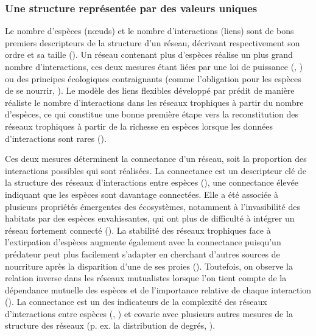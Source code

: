 \subsubsection{Une structure représentée par des valeurs uniques} 

Le nombre d'espèces (nœuds) et le nombre d'interactions (liens) sont de bons
premiers descripteurs de la structure d'un réseau, décrivant respectivement son
ordre et sa taille (\cite{Delmas2019Analysing}). Un réseau contenant plus
d'espèces réalise un plus grand nombre d'interactions, ces deux mesures étant
liées par une loi de puissance (\cite{Brose2004Unified},
\cite{Riede2010Chapter}) ou des principes écologiques contraignants (comme
l'obligation pour les espèces de se nourrir, \cite{MacDonald2020Revisiting}). Le
modèle des liens flexibles développé par \cite{MacDonald2020Revisiting} prédit
de manière réaliste le nombre d'interactions dans les réseaux trophiques à
partir du nombre d'espèces, ce qui constitue une bonne première étape vers la
reconstitution des réseaux trophiques à partir de la richesse en espèces lorsque
les données d'interactions sont rares (\cite{Strydom2021Roadmapa}). 

Ces deux mesures déterminent la connectance d'un réseau, soit la proportion des
interactions possibles qui sont réalisées. La connectance est un descripteur clé
de la structure des réseaux d'interactions entre espèces
(\cite{Martinez1992Constant}), une connectance élevée indiquant que les espèces
sont davantage connectées. Elle a été associée à plusieurs propriétés émergentes
des écosystèmes, notamment à l'invasibilité des habitats par des espèces
envahissantes, qui ont plus de difficulté à intégrer un réseau fortement
connecté (\cite{Smith-Ramesh2017Global}). La stabilité des réseaux trophiques
face à l'extirpation d'espèces augmente également avec la connectance puisqu'un
prédateur peut plus facilement s'adapter en cherchant d'autres sources de
nourriture après la disparition d'une de ses proies (\cite{Dunne2002Network}).
Toutefois, on observe la relation inverse dans les réseaux mutualistes lorsque
l'on tient compte de la dépendance mutuelle des espèces et de l'importance
relative de chaque interaction (\cite{Vieira2015Simple}). La connectance est un
des indicateurs de la complexité des réseaux d'interactions entre espèces
(\cite{Landi2018Complexity}, \cite{Strydom2021Svd}) et covarie avec plusieurs
autres mesures de la structure des réseaux (p. ex. la distribution de degrés,
\cite{Poisot2014When}).

